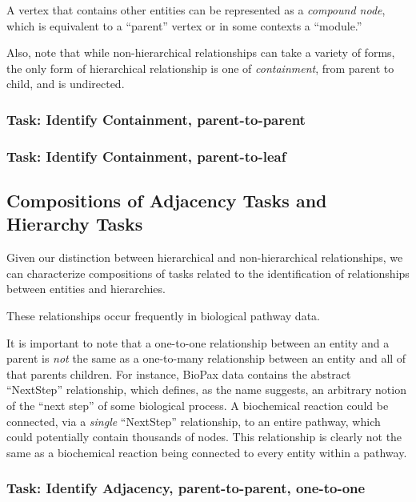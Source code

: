 \documentclass{egpubl}
\begin{document}
A vertex that contains other entities can be represented as a \textit{compound node}, which is equivalent to a ``parent'' vertex or in some contexts a ``module.''

Also, note that while non-hierarchical relationships can take a variety of forms, the only form of hierarchical relationship is one of \textit{containment}, from parent to child, and is undirected.


\subsubsection{Task: Identify Containment, parent-to-parent}
\subsubsection{Task: Identify Containment, parent-to-leaf}

\subsection{Compositions of Adjacency Tasks and Hierarchy Tasks}
Given our distinction between hierarchical and non-hierarchical relationships, we can characterize compositions of tasks related to the identification of relationships between entities and hierarchies.

These relationships occur frequently in biological pathway data.


It is important to note that a one-to-one relationship between an entity and a parent is \textit{not} the same as a one-to-many relationship between an entity and all of that parents children.
For instance, BioPax data contains the abstract ``NextStep'' relationship, which defines, as the name suggests, an arbitrary notion of the ``next step'' of some biological process.
A biochemical reaction could be connected, via a \textit{single} ``NextStep'' relationship, to an entire pathway, which could potentially contain thousands of nodes.
This relationship is clearly not the same as a biochemical reaction being connected to every entity within a pathway.

\subsubsection{Task: Identify Adjacency, parent-to-parent, one-to-one}
\end{document}
